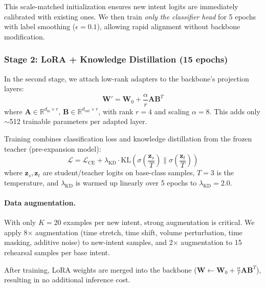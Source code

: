 \documentclass[11pt]{article}
\begin{document}
This scale-matched initialization ensures new intent logits are immediately calibrated with existing ones.
We then train \emph{only the classifier head} for 5 epochs with label smoothing ($\epsilon=0.1$), allowing rapid alignment without backbone modification.

\subsubsection{Stage 2: LoRA + Knowledge Distillation (15 epochs)}

In the second stage, we attach low-rank adapters \cite{hu2022lora} to the backbone's projection layers:
\begin{equation}
\mathbf{W}' = \mathbf{W}_0 + \frac{\alpha}{r} \mathbf{A}\mathbf{B}^T
\end{equation}
where $\mathbf{A} \in \mathbb{R}^{d_{\text{in}} \times r}$, $\mathbf{B} \in \mathbb{R}^{d_{\text{out}} \times r}$, with rank $r=4$ and scaling $\alpha=8$.
This adds only $\sim$512 trainable parameters per adapted layer.

Training combines classification loss and knowledge distillation from the frozen teacher (pre-expansion model):
\begin{equation}
\mathcal{L} = \mathcal{L}_{\text{CE}} + \lambda_{\text{KD}} \cdot \text{KL}\left(\sigma\left(\frac{\mathbf{z}_s}{T}\right) \| \sigma\left(\frac{\mathbf{z}_t}{T}\right)\right)
\end{equation}
where $\mathbf{z}_s, \mathbf{z}_t$ are student/teacher logits on base-class samples, $T=3$ is the temperature, and $\lambda_{\text{KD}}$ is warmed up linearly over 5 epochs to $\lambda_{\text{KD}}=2.0$.

\paragraph{Data augmentation.}
With only $K=20$ examples per new intent, strong augmentation is critical.
We apply 8$\times$ augmentation (time stretch, time shift, volume perturbation, time masking, additive noise) to new-intent samples, and 2$\times$ augmentation to 15 rehearsal samples per base intent.

After training, LoRA weights are merged into the backbone ($\mathbf{W} \leftarrow \mathbf{W}_0 + \frac{\alpha}{r}\mathbf{A}\mathbf{B}^T$), resulting in no additional inference cost.
\end{document}
